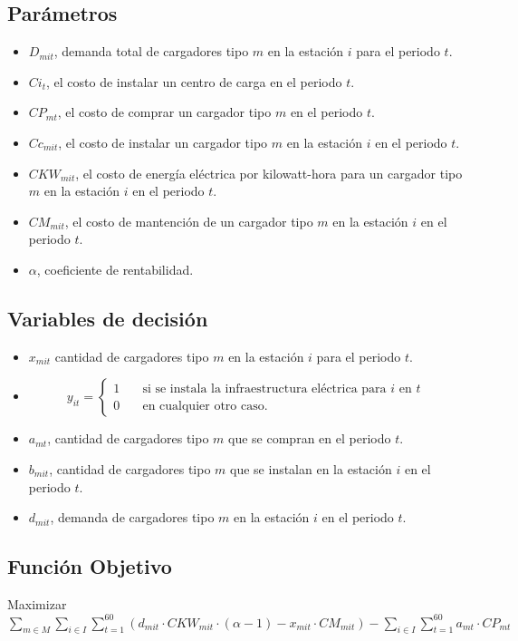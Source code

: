 \documentclass[letterpaper]{article}
\begin{document}
\begin{flushleft}
		\subsection{Parámetros}
		\begin{itemize}
			\item $D_{mit}$, demanda total de cargadores tipo $m$ en la estación $i$ para el periodo $t$.
			\item $Ci_{t}$, el costo de instalar un centro de carga en el periodo $t$.
			\item $CP_{mt}$, el costo de comprar un cargador tipo $m$ en el periodo $t$.
			\item $Cc_{mit}$, el costo de instalar un cargador tipo $m$ en la estación $i$ en el periodo $t$.
			\item $CKW_{mit}$, el costo de energía eléctrica por kilowatt-hora para un cargador tipo $m$ en la estación $i$ en el periodo $t$.
			\item $CM_{mit}$, el costo de mantención de un cargador tipo $m$ en la estación $i$ en el periodo $t$.
			\item $\alpha$, coeficiente de rentabilidad.
		\end{itemize}
		\subsection{Variables de decisión} 
		\begin{itemize}
			\item $x_{mit}$ cantidad de cargadores tipo $m$ en la estación $i$ para el periodo $t$.
			\item \[
				y_{it} = 
					 \begin{cases}
					   1 &\quad\text{si se instala la infraestructura eléctrica para }i\text{ en }t\\
					   0 &\quad\text{en cualquier otro caso.}
					 \end{cases}
				\]
			\item $a_{mt}$, cantidad de cargadores tipo $m$ que se compran en el periodo $t$.
			\item $b_{mit}$, cantidad de cargadores tipo $m$ que se instalan en la estación $i$ en el periodo $t$.
			\item $d_{mit}$, demanda de cargadores tipo $m$ en la estación $i$ en el periodo $t$.
		\end{itemize}
		\subsection{Función Objetivo}
		\begin{center}
			Maximizar $\sum_{m \in M}\sum_{i \in I} \sum_{t=1}^{60} (d_{mit} \cdot CKW_{mit} \cdot (\alpha - 1) - x_{mit} \cdot CM_{mit}) - \sum_{i \in I} \sum_{t=1}^{60} a_{mt} \cdot CP_{mt}$
		\end{center}	
		

\end{flushleft}
\end{document}
